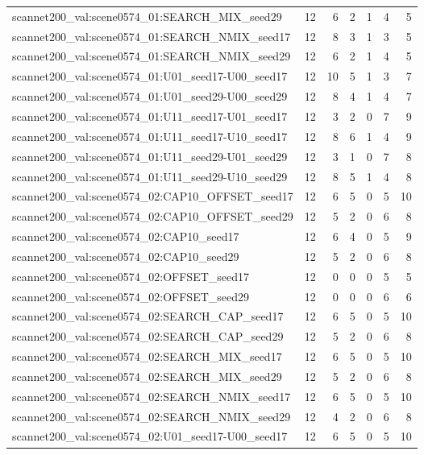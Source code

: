 \begin{table}[t]
\begin{tabular}{lrrrrrr}
scannet200\_val:scene0574\_01:SEARCH\_MIX\_seed29 & 12 & 6 & 2 & 1 & 4 & 5 \\
scannet200\_val:scene0574\_01:SEARCH\_NMIX\_seed17 & 12 & 8 & 3 & 1 & 3 & 5 \\
scannet200\_val:scene0574\_01:SEARCH\_NMIX\_seed29 & 12 & 6 & 2 & 1 & 4 & 5 \\
scannet200\_val:scene0574\_01:U01\_seed17-U00\_seed17 & 12 & 10 & 5 & 1 & 3 & 7 \\
scannet200\_val:scene0574\_01:U01\_seed29-U00\_seed29 & 12 & 8 & 4 & 1 & 4 & 7 \\
scannet200\_val:scene0574\_01:U11\_seed17-U01\_seed17 & 12 & 3 & 2 & 0 & 7 & 9 \\
scannet200\_val:scene0574\_01:U11\_seed17-U10\_seed17 & 12 & 8 & 6 & 1 & 4 & 9 \\
scannet200\_val:scene0574\_01:U11\_seed29-U01\_seed29 & 12 & 3 & 1 & 0 & 7 & 8 \\
scannet200\_val:scene0574\_01:U11\_seed29-U10\_seed29 & 12 & 8 & 5 & 1 & 4 & 8 \\
scannet200\_val:scene0574\_02:CAP10\_OFFSET\_seed17 & 12 & 6 & 5 & 0 & 5 & 10 \\
scannet200\_val:scene0574\_02:CAP10\_OFFSET\_seed29 & 12 & 5 & 2 & 0 & 6 & 8 \\
scannet200\_val:scene0574\_02:CAP10\_seed17 & 12 & 6 & 4 & 0 & 5 & 9 \\
scannet200\_val:scene0574\_02:CAP10\_seed29 & 12 & 5 & 2 & 0 & 6 & 8 \\
scannet200\_val:scene0574\_02:OFFSET\_seed17 & 12 & 0 & 0 & 0 & 5 & 5 \\
scannet200\_val:scene0574\_02:OFFSET\_seed29 & 12 & 0 & 0 & 0 & 6 & 6 \\
scannet200\_val:scene0574\_02:SEARCH\_CAP\_seed17 & 12 & 6 & 5 & 0 & 5 & 10 \\
scannet200\_val:scene0574\_02:SEARCH\_CAP\_seed29 & 12 & 5 & 2 & 0 & 6 & 8 \\
scannet200\_val:scene0574\_02:SEARCH\_MIX\_seed17 & 12 & 6 & 5 & 0 & 5 & 10 \\
scannet200\_val:scene0574\_02:SEARCH\_MIX\_seed29 & 12 & 5 & 2 & 0 & 6 & 8 \\
scannet200\_val:scene0574\_02:SEARCH\_NMIX\_seed17 & 12 & 6 & 5 & 0 & 5 & 10 \\
scannet200\_val:scene0574\_02:SEARCH\_NMIX\_seed29 & 12 & 4 & 2 & 0 & 6 & 8 \\
scannet200\_val:scene0574\_02:U01\_seed17-U00\_seed17 & 12 & 6 & 5 & 0 & 5 & 10 \\

\end{tabular}
\end{table}
